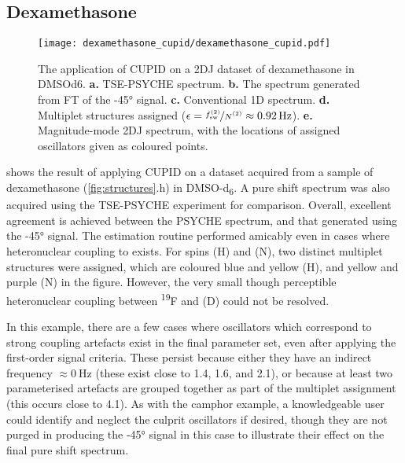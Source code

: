 \subsection{Dexamethasone}
\begin{sidewaysfigure}%
    \centering%
    \texttt{[image: dexamethasone\_cupid/dexamethasone\_cupid.pdf]}%
    \caption[
        The application of \acs{CUPID} on a dexamethasone dataset.
    ]{
        The application of \acs{CUPID} on a \ac{2DJ} dataset of dexamethasone in
        \acs{DMSOd6}.
        \textbf{a.} \acs{TSE-PSYCHE} spectrum.
        \textbf{b.} The spectrum generated from \ac{FT} of the \ang{-45}
        signal.
        \textbf{c.} Conventional \acs{1D} spectrum.
        \textbf{d.} Multiplet structures assigned ($\epsilon =
        \nicefrac{\fswtwo}{\Ntwo} \approx \qty{0.92}{\hertz}$).
        \textbf{e.} Magnitude-mode \acs{2DJ} spectrum, with the locations of
        assigned oscillators given as coloured points.
    }
    \label{fig:dexamethasone-cupid}%
\end{sidewaysfigure}%

 shows the result of applying CUPID on a
dataset acquired from a sample of dexamethasone (\cref{fig:structures}.h) in
DMSO-d\textsubscript{6}. A
pure shift spectrum was also acquired using the
\ac{TSE-PSYCHE} experiment\cite{Foroozandeh2018,Foroozandeh2015} for
comparison.
Overall, excellent agreement is achieved between the \ac{PSYCHE}
spectrum, and that generated using the \ang{-45} signal. The estimation routine
performed amicably even in cases where heteronuclear coupling to
 exists. For spins (H) and (N), two distinct
multiplet structures were assigned, which are coloured blue and yellow (H), and
yellow and purple (N) in the figure. However, the very small though perceptible
heteronuclear coupling between \textsuperscript{19}F and (D) could not be
resolved.

In this example, there are a few cases where oscillators which correspond to
strong coupling artefacts exist in the final parameter set, even after applying
the first-order signal criteria. These persist because either they have an
indirect frequency
$\approx \qty{0}{\hertz}$ (these exist close to
\qty{1.4}{\partspermillion}, \qty{1.6}{\partspermillion}, and
\qty{2.1}{\partspermillion}), or because at
least two parameterised artefacts are grouped together as part of the multiplet
assignment (this occurs close to \qty{4.1}{\partspermillion}). As with the
camphor example, a knowledgeable user could identify and neglect the culprit
oscillators if desired, though they are not purged in producing the \ang{-45}
signal in this case to illustrate their effect on the final pure shift spectrum.

